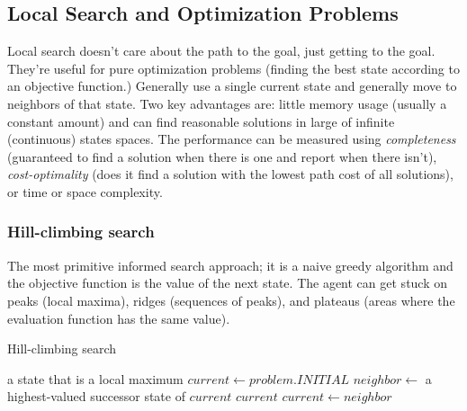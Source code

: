 \documentclass[exam={Midterm}]{cs581exam}
\begin{document}
\subsection{Local Search and Optimization Problems}\label{subsec:local-search-and-optimization-problems}
Local search doesn't care about the path to the goal, just getting to the goal.
They're useful for pure optimization problems (finding the best state according to an objective function.)
Generally use a single current state and generally move to neighbors of that state.
Two key advantages are: little memory usage (usually a constant amount) and can find reasonable solutions in large of infinite (continuous) states spaces.
The performance can be measured using \emph{completeness} (guaranteed to find a solution when there is one and report when there isn't), \emph{cost-optimality} (does it find a solution with the lowest path cost of all solutions), or time or space complexity.
%
\subsubsection{Hill-climbing search}\label{subsubsec:4.1.1}
The most primitive informed search approach; it is a naive greedy algorithm and the objective function is the value of the next state.
The agent can get stuck on peaks (local maxima), ridges (sequences of peaks), and plateaus (areas where the evaluation function has the same value).
\begin{algorithm}[H]
	\caption{Hill-climbing search}\label{alg:hill-climbing}
	\begin{algorithmic}[1]
	 \Returns a state that is a local maximum
		\State $current\gets problem.INITIAL$
			\State $neighbor\gets$ a highest-valued successor state of $current$
				\Return $current$
			\EndIf
			\State $current\gets neighbor$
		\EndWhile
	\EndFunction
	\end{algorithmic}
\end{algorithm}
\end{document}
